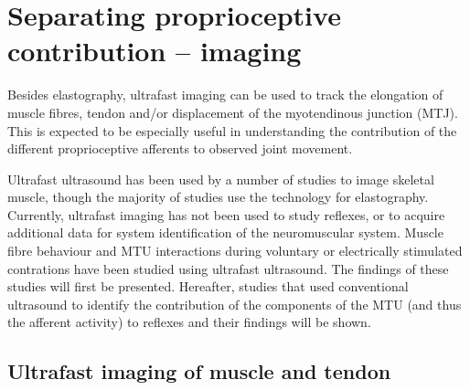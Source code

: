 \section{Separating proprioceptive contribution -- imaging}
Besides elastography, ultrafast imaging can be used to track the elongation of muscle fibres, tendon and/or displacement of the myotendinous junction (MTJ). This is expected to be especially useful in understanding the contribution of the different proprioceptive afferents to observed joint movement. 

Ultrafast ultrasound has been used by a number of studies to image skeletal muscle, though the majority of studies use the technology for elastography. Currently, ultrafast imaging has not been used to study reflexes, or to acquire additional data for system identification of the neuromuscular system. Muscle fibre behaviour and MTU interactions during voluntary or electrically stimulated contrations have been studied using ultrafast ultrasound. The findings of these studies will first be presented. 
Hereafter, studies that used conventional ultrasound to identify the contribution of the components of the MTU (and thus the afferent activity) to reflexes and their findings will be shown. %



\subsection{Ultrafast imaging of muscle and tendon}
\label{sec:ufus_muscle_tendon}

